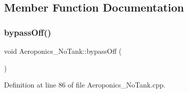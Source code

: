 \subsection{Member Function Documentation}
\mbox{\label{class_aeroponics___no_tank_a5b6d9ce2f5eb4bdfa1eae495a7d1c5d7}} 
\subsubsection{\texorpdfstring{bypass\+Off()}{bypassOff()}\hspace{0.1cm}{\footnotesize\ttfamily [1/2]}}
{\footnotesize\ttfamily void Aeroponics\+\_\+\+No\+Tank\+::bypass\+Off (\begin{DoxyParamCaption}{ }\end{DoxyParamCaption})\hspace{0.3cm}{\ttfamily [protected]}}



Definition at line 86 of file Aeroponics\+\_\+\+No\+Tank.\+cpp.


